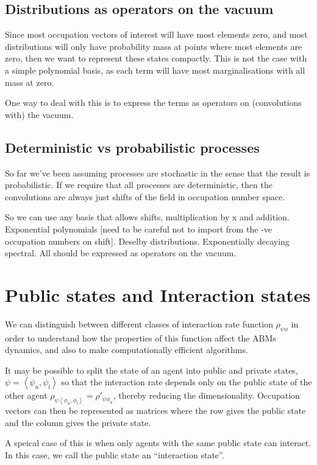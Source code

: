 \documentclass[a4paper]{article}
\begin{document}
\subsection{Distributions as operators on the vacuum}
Since most occupation vectors of interest will have most elements zero, and most distributions will only have probability mass at points where most elements are zero, then we want to represent these states compactly. This is not the case with a simple polynomial basis, as each term will have most marginalisations with all mass at zero.

One way to deal with this is to express the terms as operators on (convolutions with) the vacuum.

\subsection{Deterministic vs probabilistic processes}

So far we've been assuming processes are stochastic in the sense that the result is probabilistic. If we require that all processes are deterministic, then the convolutions are always just shifts of the field in occupation number space.

So we can use any basis that allows shifts, multiplication by x and addition. Exponential polynomials [need to be careful not to import from the -ve occupation numbers on shift]. Deselby distributions. Exponentially decaying spectral. All should be expressed as operators on the vacuum.

\section{Public states and Interaction states}

We can distinguish between different classes of interaction rate function $\rho_{\psi\phi}$ in order to understand how the properties of this function affect the ABMs dynamics, and also to make computationally efficient algorithms.

It may be possible to split the state of an agent into public and private states, $\psi = \left<\psi_u, \psi_l\right>$ so that the interaction rate depends only on the public state of the other agent $\rho_{\psi\left<\phi_u,\phi_l\right>} = \rho'_{\psi\phi_u}$, thereby reducing the dimensionality. Occupation vectors can then be represented as matrices where the row gives the public state and the column gives the private state.

A speical case of this is when only agents with the same public state can interact. In this case, we call the public state an ``interaction state''.
\end{document}
